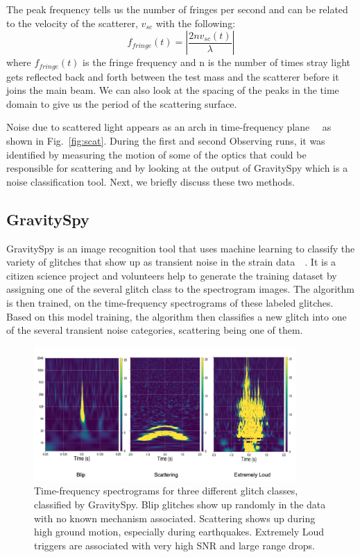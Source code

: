 \documentclass[12pt]{iopart}
\begin{document}
The peak frequency tells us the number of fringes per second and can be related to the velocity of the scatterer, $v_{sc}$ with the following:
\begin{equation}
    f_{fringe}(t) = \left|\frac{2nv_{sc}(t)}{\lambda}\right|  \label{eq:3}
\end{equation}
where $f_{fringe}(t)$ is the fringe frequency and n is the number of times stray light gets reflected back and forth between the test mass and the scatterer before it joins the main beam. We can also look at the spacing of the peaks in the time domain to give us the period of the scattering surface.

Noise due to scattered light appears as an arch in time-frequency plane~\cite{omegscan}~\cite{omegscan1} as shown in  Fig.~\ref{fig:scat}. During the first and second Observing runs, it was identified by measuring the motion of some of the optics that could be responsible for scattering and by looking at the output of GravitySpy which is a noise classification tool. Next, we briefly discuss these two methods.


\subsection{GravitySpy}
GravitySpy is an image recognition tool that uses machine learning to classify the variety of glitches that show up as transient noise in the strain data~\cite{gspy}~\cite{gspymachine}. It is a citizen science project and volunteers help to generate the training dataset by assigning one of the several glitch class to the spectrogram images. The algorithm is then trained, on the time-frequency spectrograms of these labeled glitches. Based on this model training, the algorithm then classifies a new glitch into one of the several transient noise categories, scattering being one of them.

\begin{figure}[h]
    \centering
    \includegraphics[width=10cm]{gspyglitch1.png}
    \caption{Time-frequency spectrograms for three different glitch classes, classified by GravitySpy. Blip glitches show up randomly in the data with no known mechanism associated. Scattering shows up during high ground motion, especially during earthquakes. Extremely Loud triggers are associated with very high SNR and large range drops. }
    \label{fig:gspyimages}
\end{figure}
\end{document}
